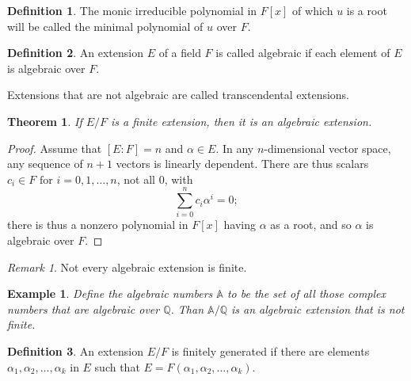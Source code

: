 \documentclass[draft]{article}
\newtheorem{thm}{Theorem}[section]
\newtheorem{exmp}{Example}
\theoremstyle{definition}
\newtheorem{defn}{Definition}[section]
\theoremstyle{remark}
\newtheorem{rem}{Remark}[section]
\begin{document}
            \begin{defn}
                The monic irreducible polynomial in $F[x]$ of which $u$ is a root will be called the minimal polynomial of $u$ over $F$.
            \end{defn}
            
            \begin{defn}
                An extension $E$ of a field $F$ is called algebraic if each element of $E$ is algebraic over $F$.\par
                Extensions that are not algebraic are called transcendental extensions.
            \end{defn}
            
            \begin{thm}
                If $E/F$ is a finite extension, then it is an algebraic extension.
            \end{thm}
            
            \begin{proof}
                Assume that $[E:F] = n$ and $\alpha \in E$. In any $n$-dimensional vector space, any sequence of $n + 1$ vectors is linearly dependent. There are thus scalars $c_i \in F \text{ for } i = 0, 1, \dots, n$, not all 0, with
                \begin{equation*}
                    \displaystyle\sum_{i = 0}^{n}{c_i\alpha^i} = 0;
                \end{equation*}
                there is thus a nonzero polynomial in $F[x]$ having $\alpha$ as a root, and so $\alpha$ is algebraic over $F$.
            \end{proof}
            
            \begin{rem}
                Not every algebraic extension is finite.
            \end{rem}
            
            \begin{exmp}
            
                Define the algebraic numbers $\mathbb{A}$ to be the set of all those complex numbers that are algebraic over $\mathbb{Q}$. Than $\mathbb{A}/\mathbb{Q}$ is an algebraic extension that is not finite.
                
            \end{exmp}
            
            \begin{defn}
            
                An extension $E/F$ is finitely generated if there are elements $\alpha_1, \alpha_2, \dots, \alpha_k$ in $E$ such that $E = F(\alpha_1, \alpha_2, \dots, \alpha_k)$.
                
            \end{defn}
            
\end{document}
